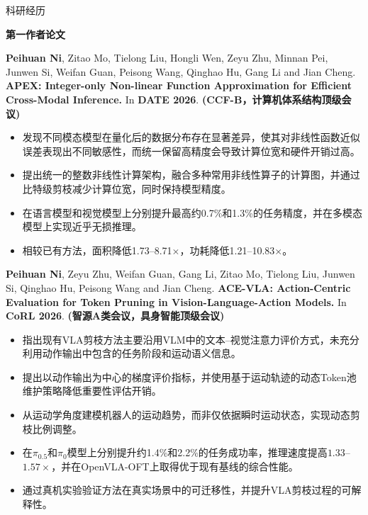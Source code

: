 \documentclass{resume}
\newenvironment{publicationentry}
{\begin{list}{}{
    \setlength{\leftmargin}{1.2em}
    \setlength{\rightmargin}{0em}
    \setlength{\topsep}{2pt}
    \setlength{\partopsep}{0pt}
    \setlength{\parsep}{0pt}
    \setlength{\itemsep}{0pt}
}\item[]}
{\end{list}}
\begin{document}
\begin{rSection}{科研经历}

\textbf{第一作者论文}

\begin{publicationentry}
\textbf{Peihuan Ni}, Zitao Mo, Tielong Liu, Hongli Wen, Zeyu Zhu,
Minnan Pei, Junwen Si, Weifan Guan, Peisong Wang, Qinghao Hu,
Gang Li and Jian Cheng.
\textbf{APEX: Integer-only Non-linear Function Approximation for Efficient
Cross-Modal Inference.}
In \textbf{DATE 2026}.
\textbf{(CCF-B，计算机体系结构顶级会议)}

\begin{itemize}
    \item 发现不同模态模型在量化后的数据分布存在显著差异，使其对非线性函数近似误差表现出不同敏感性，而统一保留高精度会导致计算位宽和硬件开销过高。
    \item 提出统一的整数非线性计算架构，融合多种常用非线性算子的计算图，并通过比特级剪枝减少计算位宽，同时保持模型精度。
    \item 在语言模型和视觉模型上分别提升最高约0.7\%和1.3\%的任务精度，并在多模态模型上实现近乎无损推理。
    \item 相较已有方法，面积降低1.73--8.71$\times$，功耗降低1.21--10.83$\times$。
\end{itemize}
\end{publicationentry}

\begin{publicationentry}
\textbf{Peihuan Ni}, Zeyu Zhu, Weifan Guan, Gang Li, Zitao Mo, Tielong Liu,
Junwen Si, Qinghao Hu, Peisong Wang and Jian Cheng.
\textbf{ACE-VLA: Action-Centric Evaluation for Token Pruning in
Vision-Language-Action Models.}
In \textbf{CoRL 2026}.
\textbf{(智源A类会议，具身智能顶级会议)}

\begin{itemize}
    \item 指出现有VLA剪枝方法主要沿用VLM中的文本--视觉注意力评价方式，未充分利用动作输出中包含的任务阶段和运动语义信息。
    \item 提出以动作输出为中心的梯度评价指标，并使用基于运动轨迹的动态Token池维护策略降低重要性评估开销。
    \item 从运动学角度建模机器人的运动趋势，而非仅依据瞬时运动状态，实现动态剪枝比例调整。
    \item 在$\pi_{0.5}$和$\pi_0$模型上分别提升约1.4\%和2.2\%的任务成功率，推理速度提高$1.33$--$1.57\times$，并在OpenVLA-OFT上取得优于现有基线的综合性能。
    \item 通过真机实验验证方法在真实场景中的可迁移性，并提升VLA剪枝过程的可解释性。
\end{itemize}
\end{publicationentry}


\end{rSection}
\end{document}
